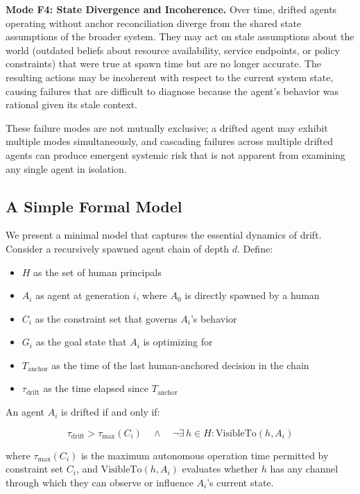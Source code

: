 \textbf{Mode F4: State Divergence and Incoherence.} Over time, drifted agents operating without anchor reconciliation diverge from the shared state assumptions of the broader system. They may act on stale assumptions about the world (outdated beliefs about resource availability, service endpoints, or policy constraints) that were true at spawn time but are no longer accurate. The resulting actions may be incoherent with respect to the current system state, causing failures that are difficult to diagnose because the agent's behavior was rational given its stale context.

These failure modes are not mutually exclusive; a drifted agent may exhibit multiple modes simultaneously, and cascading failures across multiple drifted agents can produce emergent systemic risk that is not apparent from examining any single agent in isolation.

\subsection{A Simple Formal Model}

We present a minimal model that captures the essential dynamics of drift. Consider a recursively spawned agent chain of depth $d$. Define:

\begin{itemize}
\item $H$ as the set of human principals
\item $A_i$ as agent at generation $i$, where $A_0$ is directly spawned by a human
\item $C_i$ as the constraint set that governs $A_i$'s behavior
\item $G_i$ as the goal state that $A_i$ is optimizing for
\item $T_{\text{anchor}}$ as the time of the last human-anchored decision in the chain
\item $\tau_{\text{drift}}$ as the time elapsed since $T_{\text{anchor}}$
\end{itemize}

An agent $A_i$ is drifted if and only if:

\[
\tau_{\text{drift}} > \tau_{\text{max}}(C_i) \quad \land \quad \neg\exists\, h \in H : \text{VisibleTo}(h, A_i)
\]

where $\tau_{\text{max}}(C_i)$ is the maximum autonomous operation time permitted by constraint set $C_i$, and $\text{VisibleTo}(h, A_i)$ evaluates whether $h$ has any channel through which they can observe or influence $A_i$'s current state.

